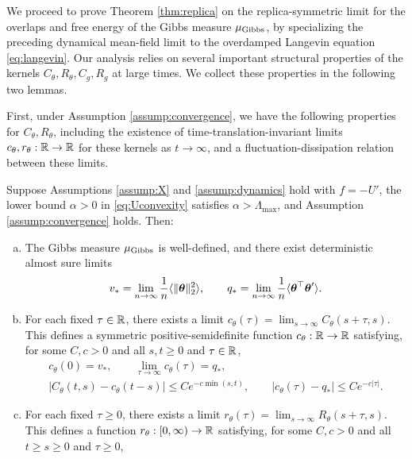 We proceed to prove Theorem \ref{thm:replica} on the replica-symmetric limit
for the overlaps and free energy of the Gibbs measure $\mu_{\mathrm{Gibbs}}$,
by specializing the preceding dynamical mean-field limit to the overdamped
Langevin equation \eqref{eq:langevin}. Our analysis relies on several
important structural
properties of the kernels $C_\theta,R_\theta,C_g,R_g$ at large times.
We collect these properties in the following two lemmas.

First, under Assumption \ref{assump:convergence}, we have the following
properties for $C_\theta,R_\theta$, including the existence of
time-translation-invariant limits $c_\theta,r_\theta:\mathbb{R} \to \mathbb{R}$ for these
kernels as $t \to \infty$, and a fluctuation-dissipation relation between
these limits.

\begin{lemma}\label{lemma:tti}
Suppose Assumptions \ref{assump:X} and \ref{assump:dynamics} hold with $f=-U'$,
the lower bound $\alpha>0$ in \eqref{eq:Uconvexity} satisfies
$\alpha>\Lambda_{\max}$, and Assumption \ref{assump:convergence} holds. Then:
\begin{enumerate}[(a)]
\item The Gibbs measure $\mu_{\mathrm{Gibbs}}$ is well-defined, and there exist deterministic almost sure limits
\begin{equation}\label{eq:vstardef-thm}
v_*=\lim_{n \to \infty}\frac{1}{n}\langle \|\boldsymbol{\theta}\|_2^2 \rangle,
\qquad q_*=\lim_{n \to \infty}\frac{1}{n}\langle \boldsymbol{\theta}^\top \boldsymbol{\theta}' \rangle.
\end{equation}
\item For each fixed $\tau \in \mathbb{R}$, there exists a limit
$c_\theta(\tau)=\lim_{s \to \infty} C_\theta(s+\tau,s)$. This defines a
symmetric positive-semidefinite function
$c_\theta:\mathbb{R} \to \mathbb{R}$ satisfying, for some $C,c>0$ and
all $s,t \geq 0$ and $\tau \in \mathbb{R}$,
\begin{equation}\label{eq:cthetabound}
\begin{gathered}
c_\theta(0)=v_*, \qquad \lim_{\tau \to \infty} c_\theta(\tau)=q_*,\\
|C_\theta(t,s)-c_\theta(t-s)|\leq Ce^{-c\min(s,t)},
\qquad |c_\theta(\tau)-q_*| \leq Ce^{-c|\tau|}.
\end{gathered}
\end{equation}
\item For each fixed $\tau \geq 0$, there exists a limit
$r_\theta(\tau)=\lim_{s \to \infty} R_\theta(s+\tau,s)$. This defines a
function $r_\theta:[0,\infty) \to \mathbb{R}$ satisfying, for some $C,c>0$
and all $t \geq s \geq 0$ and $\tau \geq 0$,

\end{enumerate}
\end{lemma}
